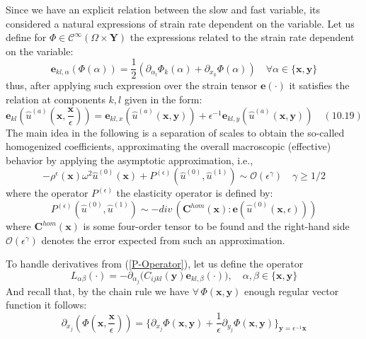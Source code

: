 Since we have an explicit relation between the slow and fast variable, its considered a natural expressions of strain rate dependent on the variable. Let us define for $\Phi \in \mathcal{C}^{\infty}(\Omega \times \mathbf{Y})$ the expressions related to the strain rate dependent on the variable:
\begin{equation*}
    \mathbf{e}_{kl,\alpha} (\Phi(\alpha)) = \frac{1}{2}(\partial_{\alpha_l} \Phi_k (\alpha) + \partial_{x_k} \Phi (\alpha)) \quad \forall \alpha \in \{\mathbf{x}, \mathbf{y}\}
\end{equation*}
thus, after applying such expression over the strain tensor $\mathbf{e}(\cdot)$ it satisfies the relation at components $k,l$ given in the form:
\begin{equation}
    \label{Multiscale-Strain}
    \mathbf{e}_{kl} ( \hat{u}^{(a)}(\mathbf{x}, \frac{\mathbf{x}}{\epsilon})) = \mathbf{e}_{kl,x}( \hat{u}^{(a)} (\mathbf{x},\mathbf{y})) + \epsilon^{-1} \mathbf{e}_{kl,y} (\hat{u}^{(a)}(\mathbf{x},\mathbf{y})) \quad (10.19)
\end{equation}
The main idea in the following is a separation of scales to obtain the so-called homogenized coefficients, approximating the overall macroscopic (effective) behavior by applying the asymptotic approximation, i.e.,
\begin{equation*}
    -\rho^{\epsilon}(\mathbf{x}) \omega^2 \hat{u}^{(0)}(\mathbf{x}) + P^{(\epsilon)}(\hat{u}^{(0)}, \hat{u}^{(1)}) \sim \mathcal{O}(\epsilon^{\gamma}) \quad \gamma \geq 1/2 
\end{equation*}
where the operator $P^{(\epsilon)}$ the elasticity operator is defined by:
\begin{equation}
    \label{P-Operator}
    P^{(\epsilon)}(\hat{u}^{(0)}, \hat{u}^{(1)}) \sim - div \, (\mathbf{C}^{hom}(\mathbf{x}): \mathbf{e}(\hat{u}^{(0)}(\mathbf{x},\epsilon)))
\end{equation}
where $\mathbf{C}^{hom}(\mathbf{x})$ is some four-order tensor to be found and the right-hand side $\mathcal{O}(\epsilon^{\gamma})$ denotes the error expected from such an approximation. 

To handle derivatives from (\ref{P-Operator}), let us define the operator 
\begin{equation*}
    L_{\alpha \beta} (\cdot) = - \partial_{\alpha_j} \big( C_{ijkl} (\mathbf{y}) \mathbf{e}_{kl, \beta}(\cdot) \big), \quad \alpha, \beta \in \{ \mathbf{x},\mathbf{y} \}
\end{equation*}
And recall that, by the chain rule we have $\forall \, \Phi(\mathbf{x},\mathbf{y})$ enough regular vector function it follows:
\begin{equation*}
    \partial_{x_j} (\Phi (\mathbf{x}, \frac{\mathbf{x}}{\epsilon})) = \big \{ \partial_{x_j} \Phi (\mathbf{x}, \mathbf{y}) + \frac{1}{\epsilon} \partial_{y_j} \Phi(\mathbf{x},\mathbf{y}) \big \}_{\mathbf{y}= \epsilon^{-1}\mathbf{x}}
\end{equation*}

